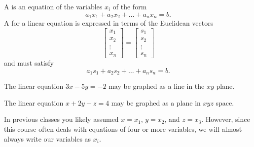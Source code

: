 
\begin{applicationActivities}{1}{3}

\begin{definition}
A  is an equation of the variables \(x_i\) of the form
\[
a_1x_1+a_2x_2+\dots+a_nx_n=b
.\]
A 
for a linear equation is expressed in terms of the Euclidean vectors
\[
  \begin{bmatrix}
    x_1 \\
    x_2 \\
    \vdots \\
    x_n
  \end{bmatrix}=
  \begin{bmatrix}
    s_1 \\
    s_2 \\
    \vdots \\
    s_n
  \end{bmatrix}
\]
and must satisfy
\[
a_1s_1+a_2s_2+\dots+a_ns_n=b
.\]
\end{definition}

\begin{observation}
The linear equation \(3x-5y=-2\) may be graphed as a line in the \(xy\) plane.

\begin{center}
\end{center}

The linear equation \(x+2y-z=4\) may be graphed as a plane in \(xyz\) space.
\end{observation}

\begin{remark}
In previous classes you likely assumed \(x=x_1\), \(y=x_2\), and \(z=x_3\).
However, since this course often deals with equations of four or more
variables, we will almost always write our variables as \(x_i\).
\end{remark}


\end{applicationActivities}
